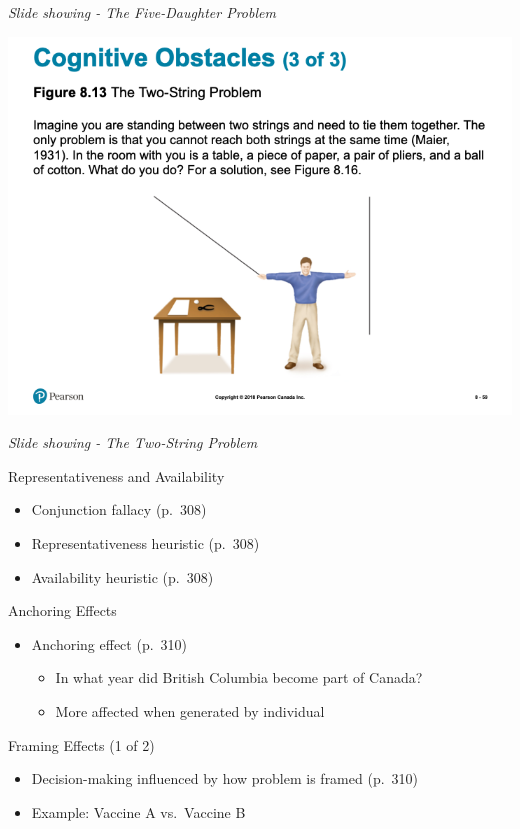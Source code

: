\documentclass[
]{book}
\providecommand{\tightlist}{%
  \setlength{\itemsep}{0pt}\setlength{\parskip}{0pt}}
\begin{document}
\emph{Slide showing - The Five-Daughter Problem}

\includegraphics{assets/unit_1/slide_59.png}

\emph{Slide showing - The Two-String Problem}

Representativeness and Availability

\begin{itemize}
\tightlist
\item
  Conjunction fallacy (p.~308)\\
\item
  Representativeness heuristic (p.~308)\\
\item
  Availability heuristic (p.~308)
\end{itemize}

Anchoring Effects

\begin{itemize}
\tightlist
\item
  Anchoring effect (p.~310)

  \begin{itemize}
  \tightlist
  \item
    In what year did British Columbia become part of Canada?\\
  \item
    More affected when generated by individual
  \end{itemize}
\end{itemize}

Framing Effects (1 of 2)

\begin{itemize}
\tightlist
\item
  Decision-making influenced by how problem is framed (p.~310)\\
\item
  Example: Vaccine A vs.~Vaccine B
\end{itemize}
\end{document}
